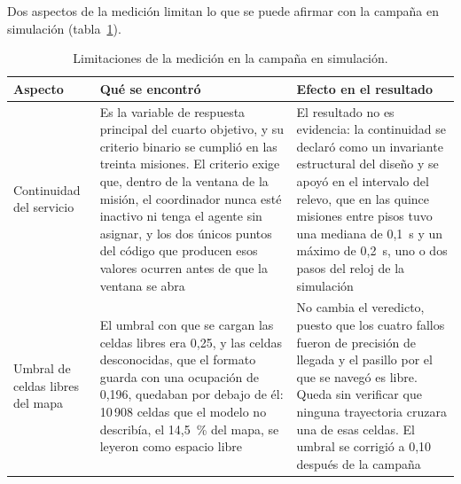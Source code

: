 Dos aspectos de la medición limitan lo que se puede afirmar con la campaña en simulación (tabla~\ref{tab:limitaciones}).

\begin{table}[H]
  \centering\footnotesize{}
  \caption{Limitaciones de la medición en la campaña en simulación.}
  \label{tab:limitaciones}
  \begin{tabular}{@{}>{\raggedright\arraybackslash}p{}>{\raggedright\arraybackslash}p{}>{\raggedright\arraybackslash}p{}@{}}
    \toprule
    \textbf{Aspecto} & \textbf{Qué se encontró} & \textbf{Efecto en el resultado} \\ \midrule
    Continuidad del servicio & Es la variable de respuesta principal del cuarto objetivo, y su criterio binario se cumplió en las treinta misiones. El criterio exige que, dentro de la ventana de la misión, el coordinador nunca esté inactivo ni tenga el agente sin asignar, y los dos únicos puntos del código que producen esos valores ocurren antes de que la ventana se abra & El resultado no es evidencia: la continuidad se declaró como un invariante estructural del diseño y se apoyó en el intervalo del relevo, que en las quince misiones entre pisos tuvo una mediana de 0,1~s y un máximo de 0,2~s, uno o dos pasos del reloj de la simulación \\ \addlinespace
    Umbral de celdas libres del mapa & El umbral con que se cargan las celdas libres era 0,25, y las celdas desconocidas, que el formato guarda con una ocupación de 0,196, quedaban por debajo de él: 10\,908 celdas que el modelo no describía, el 14,5~\% del mapa, se leyeron como espacio libre & No cambia el veredicto, puesto que los cuatro fallos fueron de precisión de llegada y el pasillo por el que se navegó es libre. Queda sin verificar que ninguna trayectoria cruzara una de esas celdas. El umbral se corrigió a 0,10 después de la campaña \\ \bottomrule
  \end{tabular}
\end{table}
